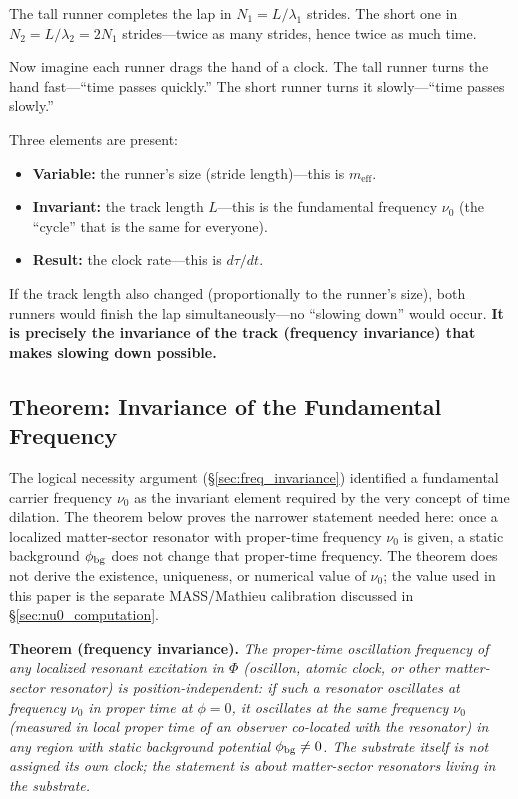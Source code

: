 \documentclass[11pt]{article}
\begin{document}
The tall runner completes the lap in $N_1 = L/\lambda_1$ strides.
The short one in $N_2 = L/\lambda_2 = 2N_1$ strides---twice as
many strides, hence twice as much time.

Now imagine each runner drags the hand of a clock. The tall runner
turns the hand fast---``time passes quickly.'' The short runner
turns it slowly---``time passes slowly.''

Three elements are present:
\begin{itemize}
  \item \textbf{Variable:} the runner's size (stride length)---this
    is $m_{\mathrm{eff}}$.
  \item \textbf{Invariant:} the track length $L$---this is the
    fundamental frequency $\nu_0$ (the ``cycle'' that is the same
    for everyone).
  \item \textbf{Result:} the clock rate---this is $d\tau/dt$.
\end{itemize}

If the track length also changed (proportionally to the runner's
size), both runners would finish the lap simultaneously---no
``slowing down'' would occur. \textbf{It is precisely the
invariance of the track (frequency invariance) that makes slowing
down possible.}

\subsection{Theorem: Invariance of the Fundamental Frequency}
\label{sec:freq_inv_theorem}

The logical necessity argument (\S\ref{sec:freq_invariance})
identified a fundamental carrier frequency $\nu_0$ as the invariant
element required by the very concept of time dilation.  The theorem
below proves the narrower statement needed here: once a localized
matter-sector resonator with proper-time frequency $\nu_0$ is given,
a static background $\phi_{\rm bg}$ does not change that proper-time
frequency.  The theorem does not derive the existence, uniqueness,
or numerical value of $\nu_0$; the value used in this paper is the
separate MASS/Mathieu calibration discussed in
\S\ref{sec:nu0_computation}.

\medskip
\textbf{Theorem (frequency invariance).}
\textit{The proper-time oscillation frequency of any localized
resonant excitation in $\Phi$ (oscillon, atomic clock, or other
matter-sector resonator) is position-independent: if such a
resonator oscillates at frequency $\nu_0$ in proper time at
$\phi = 0$, it oscillates at the same frequency $\nu_0$ (measured
in local proper time of an observer co-located with the resonator)
in any region with static background potential
$\phi_{\rm bg} \neq 0$.  The substrate itself is not assigned
its own clock; the statement is about matter-sector resonators
living in the substrate.}
\end{document}
